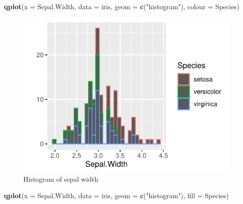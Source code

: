 \documentclass[]{article}
\newenvironment{Shaded}{\begin{snugshade}}{\end{snugshade}}
\newcommand{\DataTypeTok}[1]{\textcolor[rgb]{0.13,0.29,0.53}{#1}}
\newcommand{\KeywordTok}[1]{\textcolor[rgb]{0.13,0.29,0.53}{\textbf{#1}}}
\newcommand{\NormalTok}[1]{#1}
\newcommand{\StringTok}[1]{\textcolor[rgb]{0.31,0.60,0.02}{#1}}
\begin{document}
\begin{Shaded}
\begin{Highlighting}[]
\KeywordTok{qplot}\NormalTok{(}\DataTypeTok{x =}\NormalTok{ Sepal.Width, }\DataTypeTok{data =}\NormalTok{ iris, }\DataTypeTok{geom =} \KeywordTok{c}\NormalTok{(}\StringTok{"histogram"}\NormalTok{), }
     \DataTypeTok{colour =}\NormalTok{ Species)}
\end{Highlighting}
\end{Shaded}

\begin{figure}
\centering
\includegraphics{Week3Answers_files/figure-latex/unnamed-chunk-12-1.pdf}
\caption{Histogram of sepal width}
\end{figure}

\newpage

\begin{Shaded}
\begin{Highlighting}[]
\KeywordTok{qplot}\NormalTok{(}\DataTypeTok{x =}\NormalTok{ Sepal.Width, }\DataTypeTok{data =}\NormalTok{ iris, }\DataTypeTok{geom =} \KeywordTok{c}\NormalTok{(}\StringTok{"histogram"}\NormalTok{), }
     \DataTypeTok{fill =}\NormalTok{ Species)}
\end{Highlighting}
\end{Shaded}
\end{document}
